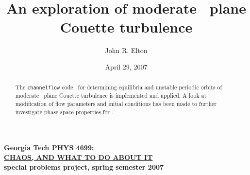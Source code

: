 \documentclass[pre,twocolumn,groupedaddress]{revtex4}
\begin{document}
                \title{
An exploration of moderate \Reynolds\ plane Couette turbulence
                }\author{
John R. Elton            }
               \date{April 29, 2007}

                \begin{abstract}
The {\tt channelflow} code~\cite{channelflow} for determining
equilibria and unstable periodic orbits of moderate \Reynolds\ plane
Couette turbulence is implemented and applied. A look at
modification of flow parameters and initial conditions has been made
to further investigate phase space properties for \pCf.

\end{abstract}
                    \maketitle

\noindent
{\bf Georgia Tech PHYS 4699:}\\
\underline{\bf CHAOS, AND WHAT TO DO ABOUT IT }\\
{\bf special problems project, spring semester 2007}


\section{\PCf}
\label{sec:PCF}
\end{document}
